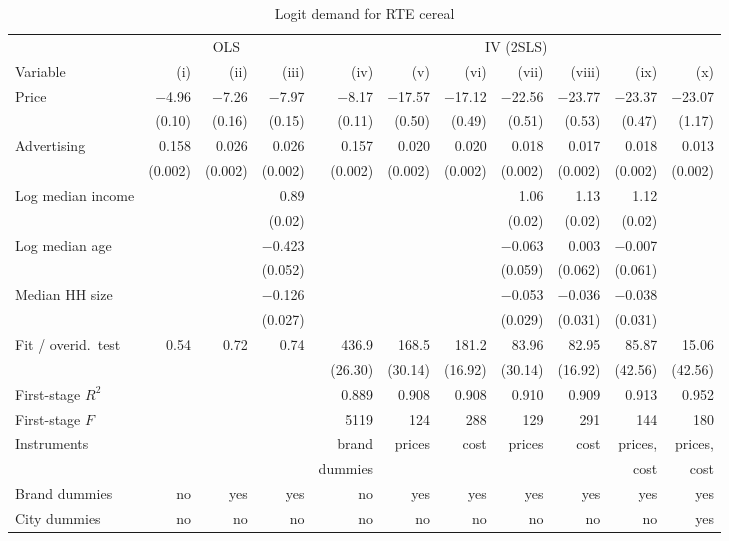 \begin{table}[htbp]
\centering
\caption{Logit demand for RTE cereal}
\label{tab:08-nevo-logit}
\scriptsize
\setlength{\tabcolsep}{2.4pt}
\begin{tabular}{@{}lrrrrrrrrrr@{}}
\toprule
 & \multicolumn{3}{c}{OLS} & \multicolumn{7}{c}{IV (2SLS)} \\
\cmidrule(lr){2-4}\cmidrule(l){5-11}
Variable & (i) & (ii) & (iii) & (iv) & (v) & (vi) & (vii) & (viii) & (ix) & (x) \\
\midrule
Price & $-$4.96 & $-$7.26 & $-$7.97 & $-$8.17 & $-$17.57 & $-$17.12 & $-$22.56 & $-$23.77 & $-$23.37 & $-$23.07 \\
 & (0.10) & (0.16) & (0.15) & (0.11) & (0.50) & (0.49) & (0.51) & (0.53) & (0.47) & (1.17) \\
Advertising & 0.158 & 0.026 & 0.026 & 0.157 & 0.020 & 0.020 & 0.018 & 0.017 & 0.018 & 0.013 \\
 & (0.002) & (0.002) & (0.002) & (0.002) & (0.002) & (0.002) & (0.002) & (0.002) & (0.002) & (0.002) \\
Log median income & & & 0.89 & & & & 1.06 & 1.13 & 1.12 & \\
 & & & (0.02) & & & & (0.02) & (0.02) & (0.02) & \\
Log median age & & & $-$0.423 & & & & $-$0.063 & 0.003 & $-$0.007 & \\
 & & & (0.052) & & & & (0.059) & (0.062) & (0.061) & \\
Median HH size & & & $-$0.126 & & & & $-$0.053 & $-$0.036 & $-$0.038 & \\
 & & & (0.027) & & & & (0.029) & (0.031) & (0.031) & \\
\addlinespace
Fit / overid.\ test & 0.54 & 0.72 & 0.74 & 436.9 & 168.5 & 181.2 & 83.96 & 82.95 & 85.87 & 15.06 \\
 & & & & (26.30) & (30.14) & (16.92) & (30.14) & (16.92) & (42.56) & (42.56) \\
First-stage $R^2$ & & & & 0.889 & 0.908 & 0.908 & 0.910 & 0.909 & 0.913 & 0.952 \\
First-stage $F$ & & & & 5119 & 124 & 288 & 129 & 291 & 144 & 180 \\
Instruments & & & & brand & prices & cost & prices & cost & prices, & prices, \\
 & & & & dummies & & & & & cost & cost \\
\addlinespace
Brand dummies & no & yes & yes & no & yes & yes & yes & yes & yes & yes \\
City dummies & no & no & no & no & no & no & no & no & no & yes \\
\bottomrule
\end{tabular}


\end{table}
